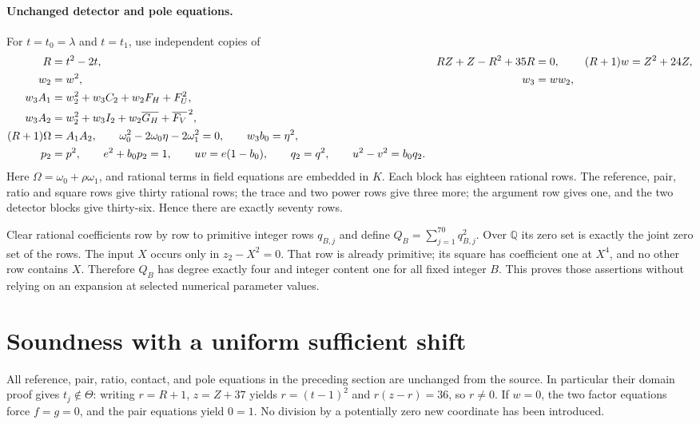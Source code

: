 \documentclass[11pt,a4paper]{article}
\theoremstyle{remark}\newtheorem{remark}[theorem]{Remark}
\newcommand{\Q}{\mathbb Q}\newcommand{\Z}{\mathbb Z}
\begin{document}
\paragraph{Unchanged detector and pole equations.}
For $t=t_0=\lambda$ and $t=t_1$, use independent copies of
\begin{align}
 R&=t^2-2t, & RZ+Z-R^2+35R&=0, & (R+1)w&=Z^2+24Z,\notag\\
 w_2&=w^2, & w_3&=ww_2,\notag\\
 w_3A_1&=w_2^2+w_3C_2+w_2F_H+F_U^2,\notag\\
 w_3A_2&=w_2^2+w_3I_2+w_2\overline{G_H}+\overline{F_V}^{\,2},\notag\\
 (R+1)\Omega&=A_1A_2,\qquad
 \omega_0^2-2\omega_0\eta-2\omega_1^2=0,\qquad w_3b_0=\eta^2,\notag\\
 p_2&=p^2,\qquad e^2+b_0p_2=1,\qquad
 uv=e(1-b_0),\qquad q_2=q^2,\qquad u^2-v^2=b_0q_2.
 \label{eq:detectors}
\end{align}
Here $\Omega=\omega_0+\rho\omega_1$, and rational terms in field
equations are embedded in $K$. Each block has eighteen rational rows.
The reference, pair, ratio and square rows give thirty rational rows;
the trace and two power rows give three more; the argument row gives
one, and the two detector blocks give thirty-six. Hence there are
exactly seventy rows.

Clear rational coefficients row by row to primitive integer rows
$q_{B,j}$ and define $Q_B=\sum_{j=1}^{70}q_{B,j}^2$.
Over $\Q$ its zero set is exactly the joint zero set of the rows.
The input $X$ occurs only in $z_2-X^2=0$. That row is already primitive;
its square has coefficient one at $X^4$, and no other row contains $X$.
Therefore $Q_B$ has degree exactly four and integer content one for
all fixed integer $B$. This proves those assertions without relying
on an expansion at selected numerical parameter values.

\section{Soundness with a uniform sufficient shift}
All reference, pair, ratio, contact, and pole equations in the preceding
section are unchanged from the source. In particular their domain proof
gives $t_j\notin\Theta$: writing $r=R+1$, $z=Z+37$ yields
$r=(t-1)^2$ and $r(z-r)=36$, so $r\ne0$. If $w=0$, the two factor
equations force $f=g=0$, and the pair equations yield $0=1$.
No division by a potentially zero new coordinate has been introduced.
\end{document}
